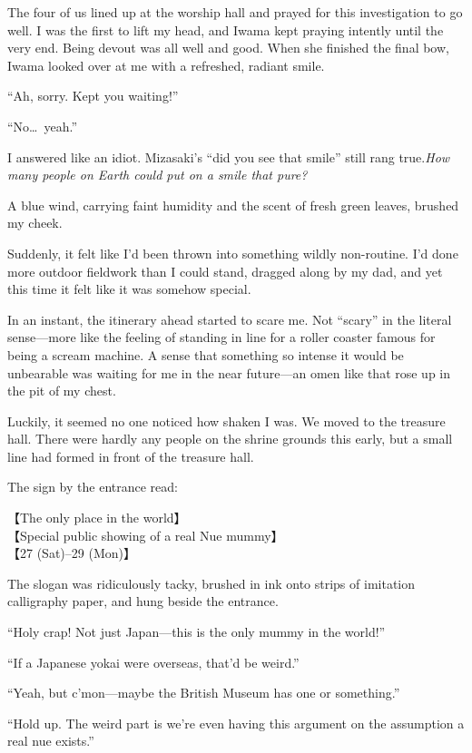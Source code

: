 \documentclass[
    a4paper,
    12pt,
    twoside,
    openany,
    UTF8,
    fontset=windows
]{ctexbook}
\begin{document}
The four of us lined up at the worship hall and prayed for this investigation to go well. I was the first to lift my head, and Iwama kept praying intently until the very end. Being devout was all well and good. When she finished the final bow, Iwama looked over at me with a refreshed, radiant smile.

``Ah, sorry. Kept you waiting!''

``No\dots\ yeah.''

I answered like an idiot. Mizasaki's ``did you see that smile'' still rang true.\textit{How many people on Earth could put on a smile that pure?} 

A blue wind, carrying faint humidity and the scent of fresh green leaves, brushed my cheek.

Suddenly, it felt like I'd been thrown into something wildly non-routine. I'd done more outdoor fieldwork than I could stand, dragged along by my dad, and yet this time it felt like it was somehow special.

In an instant, the itinerary ahead started to scare me. Not ``scary'' in the literal sense---more like the feeling of standing in line for a roller coaster famous for being a scream machine. A sense that something so intense it would be unbearable was waiting for me in the near future---an omen like that rose up in the pit of my chest.

Luckily, it seemed no one noticed how shaken I was. We moved to the treasure hall. There were hardly any people on the shrine grounds this early, but a small line had formed in front of the treasure hall.

The sign by the entrance read:

{\bfseries
\begin{center}
【The only place in the world】\\
【Special public showing of a real Nue mummy】\\
【27 (Sat)--29 (Mon)】
\end{center}
}

The slogan was ridiculously tacky, brushed in ink onto strips of imitation calligraphy paper, and hung beside the entrance.

``Holy crap! Not just Japan---this is the only mummy in the world!''

``If a Japanese yokai were overseas, that'd be weird.''

``Yeah, but c'mon---maybe the British Museum has one or something.''

``Hold up. The weird part is we're even having this argument on the assumption a real nue exists.''
\end{document}
